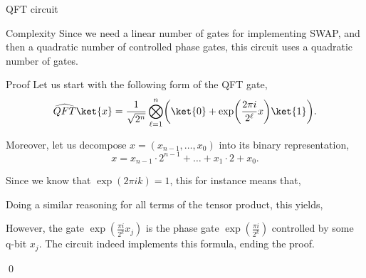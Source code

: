 \documentclass[a4paper]{article}
\begin{document}
\begin{parag}{QFT circuit}
    \begin{subparag}{Complexity}
        Since we need a linear number of gates for implementing SWAP, and then a quadratic number of controlled phase gates, this circuit uses a quadratic number of gates.
    \end{subparag}

    \begin{subparag}{Proof}
        Let us start with the following form of the QFT gate,
        \[\widehat{QFT} \ket{x} = \frac{1}{\sqrt{2^n}} \bigotimes_{\ell = 1}^{n} \left(\ket{0} + \exp\left(\frac{2\pi i}{2^\ell } x\right)\ket{1}\right).\]

        Moreover, let us decompose $x = \left(x_{n-1}, \ldots, x_0\right)$ into its binary representation, 
        \[x = x_{n-1} \cdot 2^{n-1} + \ldots + x_1 \cdot 2 + x_0.\]

        Since we know that $\exp\left(2 \pi i k\right) = 1$, this for instance means that,
        
        Doing a similar reasoning for all terms of the tensor product, this yields, 

        However, the gate $\exp\left(\frac{\pi i}{2^k} x_j\right)$ is the phase gate $\exp\left(\frac{\pi i}{2^k}\right)$ controlled by some q-bit $x_j$. The circuit indeed implements this formula, ending the proof.

        \qed
    \end{subparag}
\end{parag}
\end{document}
